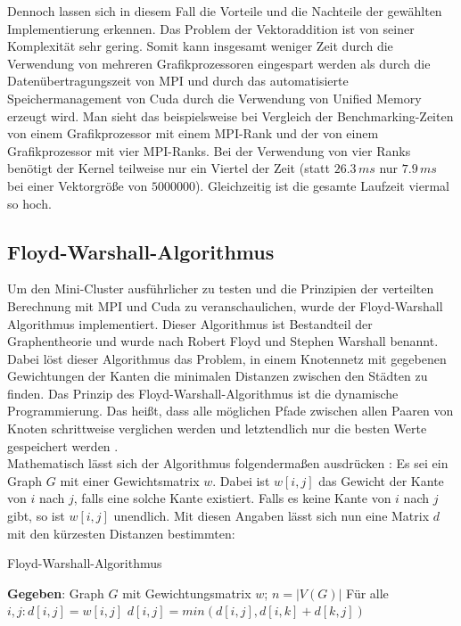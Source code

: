 \documentclass[doktyp=semarbeit, sprache=german]{TUBAFarbeiten}
\begin{document}
Dennoch lassen sich in diesem Fall die Vorteile und die Nachteile der gewählten Implementierung erkennen. Das Problem der Vektoraddition ist von seiner Komplexität sehr gering. Somit kann insgesamt weniger Zeit durch die Verwendung von mehreren Grafikprozessoren eingespart werden als durch die Datenübertragungszeit von MPI und durch das automatisierte Speichermanagement von Cuda durch die Verwendung von Unified Memory erzeugt wird. Man sieht das beispielsweise bei Vergleich der Benchmarking-Zeiten von einem Grafikprozessor mit einem MPI-Rank und der von einem Grafikprozessor mit vier MPI-Ranks. Bei der Verwendung von vier Ranks benötigt der Kernel teilweise nur ein Viertel der Zeit (statt $26.3\,ms$ nur $7.9\,ms$ bei einer Vektorgröße von $5 000 000$). Gleichzeitig ist die gesamte Laufzeit viermal so hoch.
\subsection{Floyd-Warshall-Algorithmus}
Um den Mini-Cluster ausführlicher zu testen und die Prinzipien der verteilten Berechnung mit MPI und Cuda zu veranschaulichen, wurde der Floyd-Warshall Algorithmus implementiert. Dieser Algorithmus ist Bestandteil der Graphentheorie und wurde nach Robert Floyd und Stephen Warshall benannt. Dabei löst dieser Algorithmus das Problem, in einem Knotennetz mit gegebenen Gewichtungen der Kanten die minimalen Distanzen zwischen den Städten zu finden. Das Prinzip des Floyd-Warshall-Algorithmus ist die dynamische Programmierung. Das heißt, dass alle möglichen Pfade zwischen allen Paaren von Knoten schrittweise verglichen werden und letztendlich nur die besten Werte gespeichert werden \cite{Floyd}.
\\Mathematisch lässt sich der Algorithmus folgendermaßen ausdrücken \cite{WikiFloyd}: Es sei ein Graph $G$ mit einer Gewichtsmatrix $w$. Dabei ist $w[i,j]$ das Gewicht der Kante von $i$ nach $j$, falls eine solche Kante existiert. Falls es keine Kante von $i$ nach $j$ gibt, so ist $w[i,j]$ unendlich. Mit diesen Angaben lässt sich nun eine Matrix $d$ mit den kürzesten Distanzen bestimmten:
\newpage
\begin{algorithm}
\caption{Floyd-Warshall-Algorithmus}
\label{alg:floyd}
\begin{algorithmic}[1]
\State \textbf{Gegeben}: Graph $G$ mit Gewichtungsmatrix $w$;
\State $n = |V(G)|$
\State Für alle $i,j: d[i,j] = w[i,j]$
\State $d[i,j] = min(d[i,j], d[i,k] + d[k,j])$
\EndFor
\EndFor
\end{algorithmic}
\end{algorithm}
\end{document}
